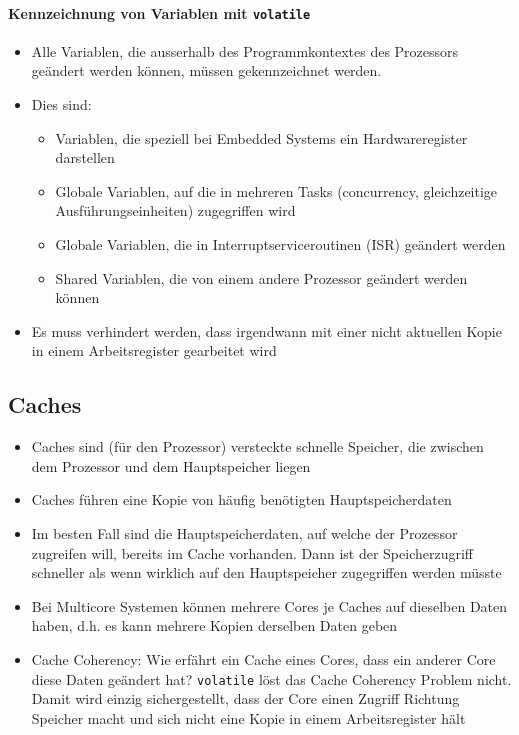 \paragraph{Kennzeichnung von Variablen mit \lstinline{volatile}}
\begin{itemize}
	\item Alle Variablen, die ausserhalb des Programmkontextes des Prozessors geändert werden können, müssen gekennzeichnet werden.
	\item Dies sind:
	\begin{itemize}
		\item Variablen, die speziell bei Embedded Systems ein Hardwareregister darstellen
		\item Globale Variablen, auf die in mehreren Tasks (concurrency, gleichzeitige Ausführungseinheiten) zugegriffen wird
		\item Globale Variablen, die in Interruptserviceroutinen (ISR) geändert werden
		\item Shared Variablen, die von einem andere Prozessor geändert werden können
	\end{itemize}
	\item Es muss verhindert werden, dass irgendwann mit einer nicht aktuellen Kopie in einem Arbeitsregister gearbeitet wird
\end{itemize}

\subsection{Caches}
\begin{itemize}
	\item Caches sind (für den Prozessor) versteckte schnelle Speicher, die zwischen dem Prozessor und dem Hauptspeicher liegen
	\item Caches führen eine Kopie von häufig benötigten Hauptspeicherdaten
	\item Im besten Fall sind die Hauptspeicherdaten, auf welche der Prozessor zugreifen will, bereits im Cache vorhanden.  Dann ist der Speicherzugriff schneller als wenn wirklich auf den Hauptspeicher zugegriffen werden müsste
	\item Bei Multicore Systemen können mehrere Cores je Caches auf dieselben Daten haben, d.h. es kann mehrere Kopien derselben Daten geben
	\item Cache Coherency: Wie erfährt ein Cache eines Cores, dass ein anderer Core diese Daten geändert hat? \lstinline{volatile} löst das Cache Coherency Problem nicht. Damit wird einzig sichergestellt, dass der Core einen Zugriff Richtung Speicher macht und sich nicht eine Kopie in einem Arbeitsregister hält
\end{itemize}

